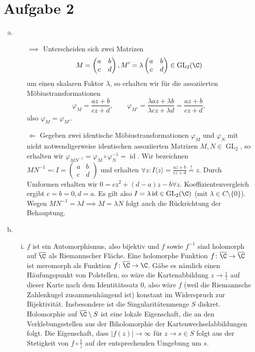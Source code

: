 \documentclass{article}
\begin{document}
\section*{Aufgabe 2}
\begin{enumerate}[(a)]
    \item \begin{enumerate}
        \item[$\implies$] Unterscheiden sich zwei Matrizen \[M = \begin{pmatrix}
        a & b\\c&d
    \end{pmatrix}, M' = \lambda \begin{pmatrix}
        a & b\\c&d
    \end{pmatrix} \in \operatorname{GL}_2(\C)\] um einen skalaren Faktor $\lambda$, 
    so erhalten wir für die assoziierten Möbiustransformationen
    \[
        \varphi_M = \frac{az + b}{cz + d}, \qquad \varphi_{M'} = \frac{\lambda a z + \lambda b}{\lambda cz + \lambda d} = \frac{az + b}{cz+ d},
    \]
    also $\varphi_M = \varphi_{M'}$.
    \item[$\Longleftarrow$] Gegeben zwei identische Möbiustransformationen $\varphi_M$ und $\varphi_{N}$ mit nicht notwendigerweise identischen assoziierten Matrizen $M, N \in \operatorname{GL}_2$, so erhalten wir $\varphi_{MN^{-1}} = \varphi_M \circ \varphi_N^{-1} = \operatorname{id}$. Wir bezeichnen $MN^{-1} \eqqcolon I = \begin{pmatrix}
        a&b\\c&d
    \end{pmatrix}$ und erhalten $\forall z \colon I\langle z \rangle = \frac{az + b}{cz + d} \overset{!}{=} z$.
    Durch Umformen erhalten wir $0 = cz^2 + (d-a)z - b \forall z$. Koeffizientenvergleich ergibt $c = b = 0, d = a$.
    Es gilt also $I = \lambda \operatorname{id} \in \operatorname{GL}_2(\C)$ (mit $\lambda \in C\setminus\{0\}$).
    Wegen $MN^{-1} = \lambda I \implies M = \lambda N$ folgt auch die Rückrichtung der Behauptung.
    \end{enumerate}
    \item \begin{enumerate}[(i)]
        \item $f$ ist ein Automorphismus, also bijektiv und $f$ sowie $f^{-1}$ sind holomorph auf $\overline{\C}$ als Riemannscher Fläche. Eine holomorphe Funktion $f\colon \overline{\C} \to \overline{\C}$ ist meromorph als Funktion $f\colon \overline{\C} \to \C$. Gäbe es nämlich einen Häufungspunkt von Polstellen, so wäre die Kartenabbildung $z \to \frac{1}{z}$ auf dieser Karte nach dem Identitätssatz 0, also wäre $f$ (weil die Riemannsche Zahlenkugel zusammenhängend ist) konstant im Widerspruch zur Bijektivität. Insbesondere ist die Singularitätenmenge $S$ diskret. Holomorphie auf $\overline{\C} \setminus S$ ist eine lokale Eigenschaft, die an den Verklebungsstellen aus der Biholomorphie der Kartenwechselabbildungen folgt. Die Eigenschaft, dass $|f(z)| \to \infty$ für $z \to s \in S$ folgt aus der Stetigkeit von $f \circ \frac{1}{z}$ auf der entsprechenden Umgebung um $s$.

\end{enumerate}
\end{enumerate}
\end{document}

